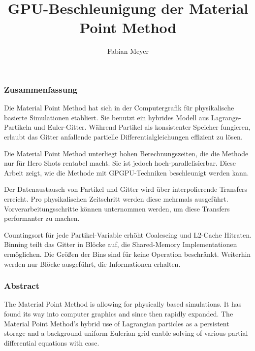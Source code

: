 \documentclass[m,times]{cgMA}
\begin{document}
\author{Fabian Meyer}
\title{GPU-Beschleunigung der Material Point Method}

\maketitle

\clearpage
{}

\vfill
\begin{center}
\subsubsection*{Zusammenfassung}
\end{center}
Die Material Point Method hat sich in der Computergrafik für physikalische basier\-te Simulationen etabliert. Sie benutzt ein hybrides Modell aus Lagrange-Partikeln und Euler-Gitter. Während Partikel als konsistenter Speicher fungieren, erlaubt das Gitter anfallende partielle Differentialgleichungen effizient zu lösen.

\noindent Die Material Point Method unterliegt hohen Berechnungszeiten, die die Methode nur für Hero Shots rentabel macht. Sie ist jedoch hoch-parallelisierbar. Diese Arbeit zeigt, wie die Methode mit GPGPU-Techniken beschleunigt werden kann.

\noindent Der Datenaustausch von Partikel und Gitter wird über interpolierende Transfers erreicht. Pro physikalischen Zeitschritt werden diese mehrmals ausgeführt. Vorverarbeitungsschritte können unternommen werden, um diese Transfers performanter zu machen.

\noindent Countingsort für jede Partikel-Variable erhöht Coalescing und L2-Cache Hitraten. Binning teilt das Gitter in Blöcke auf, die Shared-Memory Implementationen ermög\-lich\-en. Die Größen der Bins sind für keine Operation beschränkt. Weiterhin werden nur Blöcke ausgeführt, die Informationen erhalten.

\vfill
\begin{center}
\subsubsection*{Abstract}
\end{center}
The Material Point Method is allowing for physically based simulations. It has found its way into computer graphics and since then rapidly expanded. The Material Point Method's hybrid use of Lagrangian particles as a persistent storage and a background uniform Eulerian grid enable solving of various partial differential equations with ease.
\end{document}

